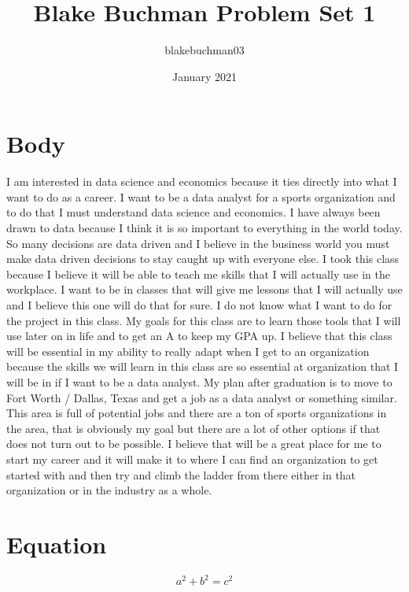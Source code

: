 \documentclass{article}
\title{Blake Buchman Problem Set 1}
\author{blakebuchman03 }
\date{January 2021}
\begin{document}
\maketitle

\section{Body}
I am interested in data science and economics because it ties directly into what I want to do as a career. I want to be a data analyst for a sports organization and to do that I must understand data science and economics. I have always been drawn to data because I think it is so important to everything in the world today. So many decisions are data driven and I believe in the business world you must make data driven decisions to stay caught up with everyone else. I took this class because I believe it will be able to teach me skills that I will actually use in the workplace. I want to be in classes that will give me lessons that I will actually use and I believe this one will do that for sure. I do not know what I want to do for the project in this class. My goals for this class are to learn those tools that I will use later on in life and to get an A to keep my GPA up. I believe that this class will be essential in my ability to really adapt when I get to an organization because the skills we will learn in this class are so essential at organization that I will be in if I want to be a data analyst.  My plan after graduation is to move to Fort Worth / Dallas, Texas and get a job as a data analyst or something similar. This area is full of potential jobs and there are a ton of sports organizations in the area, that is obviously my goal but there are a lot of other options if that does not turn out to be possible. I believe that will be a great place for me to start my career and it will make it to where I can find an organization to get started with and then try and climb the ladder from there either in that organization or in the industry as a whole.

\section{Equation}
\[ a^2 + b^2 = c^2 \]
\end{document}
